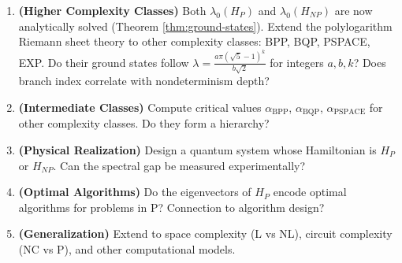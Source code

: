 \begin{enumerate}
\item \textbf{(Higher Complexity Classes)} Both $\lambda_0(H_P)$ and $\lambda_0(H_{NP})$ are now analytically solved (Theorem \ref{thm:ground-states}). Extend the polylogarithm Riemann sheet theory to other complexity classes: BPP, BQP, PSPACE, EXP. Do their ground states follow $\lambda = \frac{a\pi(\sqrt{5}-1)^k}{b\sqrt{2}}$ for integers $a,b,k$? Does branch index correlate with nondeterminism depth?

\item \textbf{(Intermediate Classes)} Compute critical values $\alpha_{\text{BPP}}$, $\alpha_{\text{BQP}}$, $\alpha_{\text{PSPACE}}$ for other complexity classes. Do they form a hierarchy?

\item \textbf{(Physical Realization)} Design a quantum system whose Hamiltonian is $H_P$ or $H_{NP}$. Can the spectral gap be measured experimentally?

\item \textbf{(Optimal Algorithms)} Do the eigenvectors of $H_P$ encode optimal algorithms for problems in P? Connection to algorithm design?

\item \textbf{(Generalization)} Extend to space complexity (L vs NL), circuit complexity (NC vs P), and other computational models.
\end{enumerate}
